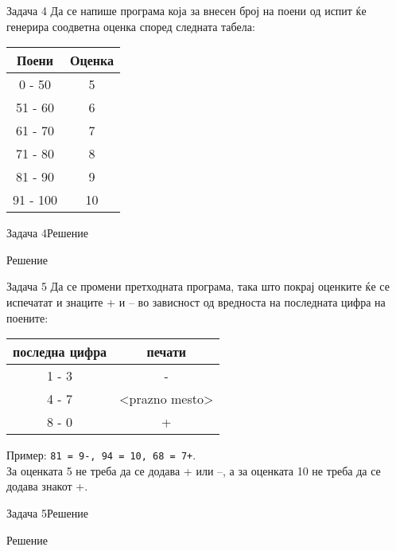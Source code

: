 \begin{frame}[fragile]{Задача 4}
Да се напише програма која за внесен број на поени од испит ќе генерира соодветна оценка според следната табела:
\begin{center}
\begin{tabular}{|c|c|}
\hline \textbf{Поени} & \textbf{Оценка} \\ 
\hline 0 - 50 & 5 \\ 
\hline 51 - 60 & 6 \\ 
\hline 61 - 70 & 7 \\ 
\hline 71 - 80 & 8 \\ 
\hline 81 - 90 & 9 \\ 
\hline 91 - 100 & 10 \\ 
\hline
\end{tabular} 
\end{center}
\end{frame}

\begin{frame}[fragile]{Задача 4}{Решение}
    \begin{exampleblock}{Решение}
    
	\end{exampleblock}
\end{frame}

\begin{frame}[fragile]{Задача 5}
Да се промени претходната програма, така што покрај оценките ќе се испечатат и знаците + и – во зависност од вредноста на последната цифра на поените:
\begin{center}
\begin{tabular}{|c|c|}
\hline \textbf{последна цифра} & \textbf{печати} \\ 
\hline 1 - 3 & - \\ 
\hline 4 - 7 & <prazno mesto> \\ 
\hline 8 - 0 & + \\ 
\hline 
\end{tabular} 
\end{center}
Пример: \texttt{81 = 9-, 94 = 10, 68 = 7+}.\\ 
За оценката 5 не треба да се додава + или –, а за оценката 10 не треба да се додава знакот +.
\end{frame}


\begin{frame}[fragile]{Задача 5}{Решение}
	\begin{exampleblock}{Решение}
	
	\end{exampleblock}
\end{frame}


